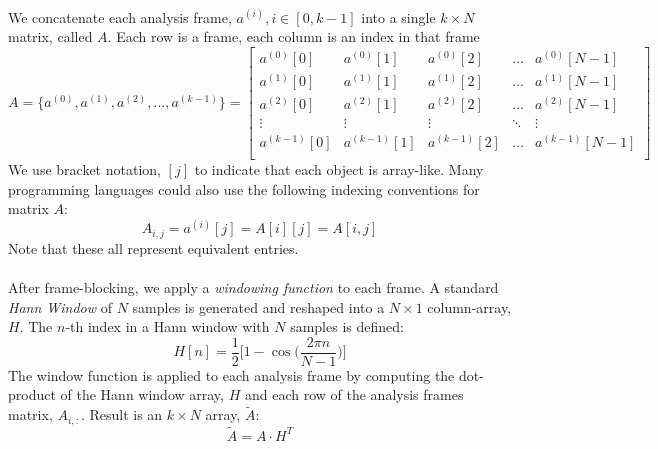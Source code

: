 \documentclass[12pt,letterpaper]{article}
\begin{document}
\paragraph*{}We concatenate each analysis frame, $a^{(i)}, i \in [0,k-1]$ into a single $k \times N$ matrix, called $A$. Each row is a frame, each column is an index in that frame
\begin{equation}
\label{eqn-FrameMatrix}
A = \big\{ a^{(0)} , a^{(1)} , a^{(2)} , ... , a^{(k-1)} \big\} = 
\begin{bmatrix}
a^{(0)}[0] & a^{(0)}[1] & a^{(0)}[2] & \hdots & a^{(0)}[N-1] \\
a^{(1)}[0] & a^{(1)}[1] & a^{(1)}[2] & \hdots & a^{(1)}[N-1] \\
a^{(2)}[0] & a^{(2)}[1] & a^{(2)}[2] & \hdots & a^{(2)}[N-1] \\
\vdots 		& \vdots 	  & \vdots 		& \ddots & \vdots        \\
a^{(k-1)}[0] & a^{(k-1)}[1] & a^{(k-1)}[2] & \hdots & a^{(k-1)}[N-1] \\
\end{bmatrix}
\end{equation}
We use bracket notation, $[j]$ to indicate that each object is array-like. Many programming languages could also use the following indexing conventions for matrix 
$A$:
\begin{equation}
\label{eqn-IndexingA}
A_{i,j} = a^{(i)}[j] = A[i][j] = A[i,j]
\end{equation}
Note that these all represent equivalent entries.

\paragraph*{}After frame-blocking, we apply a \textit{windowing function} to each frame. A standard \textit{Hann Window} of $N$ samples is generated and reshaped into a $N \times 1$ column-array,$H$. The $n$-th index in a Hann window with $N$ samples is defined:
\begin{equation}
\label{eqn-Hann}
H[n] = \frac{1}{2}\bigg[ 1 - \cos\Big( \frac{2\pi n}{N-1}\Big)\bigg]
\end{equation}
The window function is applied to each analysis frame by computing the dot-product of the Hann window array, $H$ and each row of the analysis frames matrix, $A_{i,:}$. Result is an $k \times N$ array, $\widetilde{A}$:
\begin{equation}
\label{eqn-WindowMatrix}
\widetilde{A} = A \cdot H^T
\end{equation}
\end{document}
